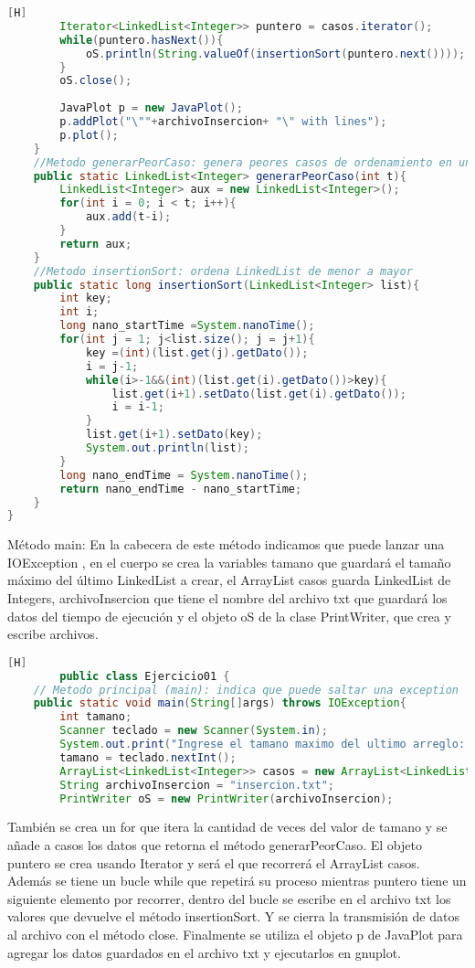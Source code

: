 \begin{enumerate}[{Ejercicio} 1.]
\begin{lstlisting}[language=java, caption={Main}][H]
        Iterator<LinkedList<Integer>> puntero = casos.iterator();
        while(puntero.hasNext()){
            oS.println(String.valueOf(insertionSort(puntero.next())));
        }
        oS.close();
        
        JavaPlot p = new JavaPlot();
        p.addPlot("\""+archivoInsercion+ "\" with lines");
        p.plot();
    }
    //Metodo generarPeorCaso: genera peores casos de ordenamiento en un LinkedList
    public static LinkedList<Integer> generarPeorCaso(int t){
        LinkedList<Integer> aux = new LinkedList<Integer>();
        for(int i = 0; i < t; i++){
            aux.add(t-i);
        }
        return aux;
    }
    //Metodo insertionSort: ordena LinkedList de menor a mayor
    public static long insertionSort(LinkedList<Integer> list){
        int key;
        int i;
        long nano_startTime =System.nanoTime();
        for(int j = 1; j<list.size(); j = j+1){
            key =(int)(list.get(j).getDato());
            i = j-1;
            while(i>-1&&(int)(list.get(i).getDato())>key){
                list.get(i+1).setDato(list.get(i).getDato());
                i = i-1;
            }
            list.get(i+1).setDato(key);
            System.out.println(list);
        }
        long nano_endTime = System.nanoTime();
        return nano_endTime - nano_startTime;
    }
}

	\end{lstlisting}
	Método main: En la cabecera de este método indicamos que puede lanzar una IOException , en el cuerpo se crea la variables tamano que guardará el tamaño máximo del último LinkedList a crear, el ArrayList casos guarda LinkedList de Integers, archivoInsercion que tiene el nombre del archivo txt que guardará los datos del tiempo de ejecución y el objeto oS de la clase PrintWriter, que crea y escribe archivos.
	\begin{lstlisting}[language=java, caption={Main}][H]
		public class Ejercicio01 {
    // Metodo principal (main): indica que puede saltar una exception 
    public static void main(String[]args) throws IOException{
        int tamano;
        Scanner teclado = new Scanner(System.in);
        System.out.print("Ingrese el tamano maximo del ultimo arreglo: ");
        tamano = teclado.nextInt();
        ArrayList<LinkedList<Integer>> casos = new ArrayList<LinkedList<Integer>>();
        String archivoInsercion = "insercion.txt";
        PrintWriter oS = new PrintWriter(archivoInsercion);
	\end{lstlisting}
	También se crea un for que itera la cantidad de veces del valor de tamano y se añade a casos los datos que retorna el método generarPeorCaso. El objeto puntero se crea usando Iterator y será el que recorrerá el ArrayList casos. Además se tiene un bucle while que repetirá su proceso mientras puntero tiene un siguiente elemento por recorrer, dentro del bucle se escribe en el archivo txt los valores que devuelve el método insertionSort. Y se cierra la transmisión de datos al archivo con el método close. Finalmente se utiliza el objeto p de JavaPlot para agregar los datos guardados en el archivo txt y ejecutarlos en gnuplot.


\end{enumerate}
